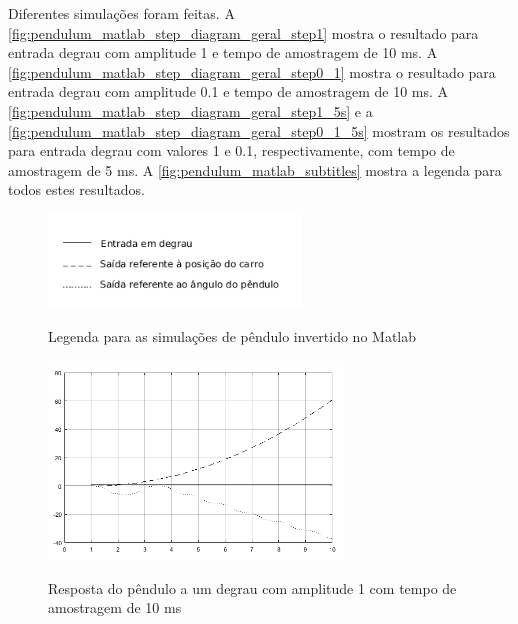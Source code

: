 Diferentes simulações foram feitas. A \autoref{fig:pendulum_matlab_step_diagram_geral_step1} mostra o resultado para entrada degrau com amplitude 1 e tempo de amostragem de 10 ms. A \autoref{fig:pendulum_matlab_step_diagram_geral_step0_1} mostra o resultado para entrada degrau com amplitude 0.1 e tempo de amostragem de 10 ms. A \autoref{fig:pendulum_matlab_step_diagram_geral_step1_5s} e a  \autoref{fig:pendulum_matlab_step_diagram_geral_step0_1_5s} mostram os resultados para entrada degrau com valores 1 e 0.1, respectivamente, com tempo de amostragem de 5 ms. A \autoref{fig:pendulum_matlab_subtitles} mostra a legenda para todos estes resultados.


\begin{figure}[!htb]
    \centering
    \caption{Legenda para as simulações de pêndulo invertido no Matlab}
    \includegraphics[width=0.6\textwidth]{./04-figuras/pendulum_matlab_subtitles}
    \label{fig:pendulum_matlab_subtitles}
\end{figure}

\begin{figure}[!htb]
    \centering
    \caption{Resposta do pêndulo a um degrau com amplitude 1 com tempo de amostragem de 10 ms}
    \includegraphics[width=0.7\textwidth]{./04-figuras/pendulum_matlab_step_diagram_geral_step1}
    \label{fig:pendulum_matlab_step_diagram_geral_step1}
\end{figure}

